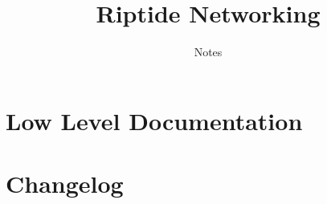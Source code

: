 \documentclass[12pt,pdftex,a4paper]{scrbook}
\begin{document}
	\thispagestyle{empty}
	\title{Riptide Networking}
	\subtitle{Notes}
	\maketitle
	
	\newpage
	\tableofcontents
	
	\part{Low Level Documentation}
	
	
	
	
	\part{Changelog}
	
	
	
\end{document}
